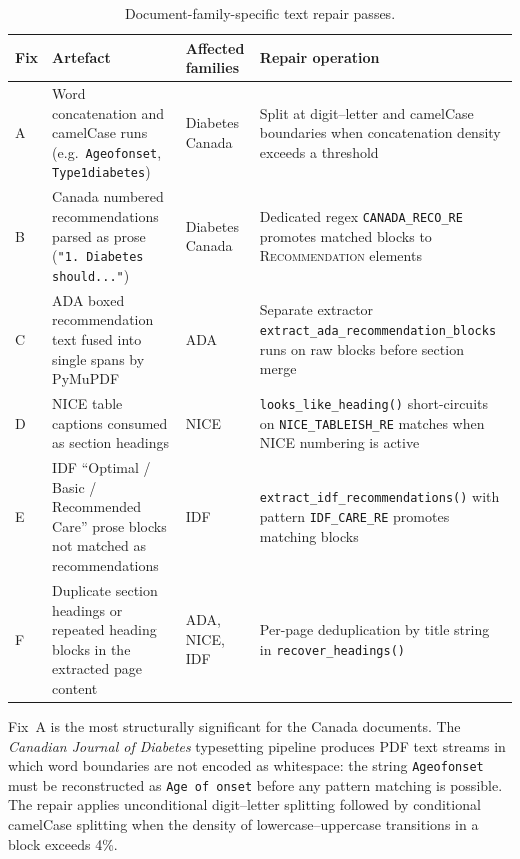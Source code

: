 \begin{table}[!ht]
\centering
\small\setlength{\tabcolsep}{5pt}
\begin{tabular}{p{0.7cm} p{3.2cm} p{2.5cm} p{4.8cm}}
\hline
\textbf{Fix} & \textbf{Artefact} & \textbf{Affected families}
              & \textbf{Repair operation} \\
\hline
A & Word concatenation and camelCase runs
    (e.g.\ \texttt{Ageofonset}, \texttt{Type1diabetes})
  & Diabetes Canada
  & Split at digit--letter and camelCase boundaries when
    concatenation density exceeds a threshold \\[4pt]
B & Canada numbered recommendations parsed as prose
    (\texttt{"1. Diabetes should..."})
  & Diabetes Canada
  & Dedicated regex \texttt{CANADA\_RECO\_RE} promotes
    matched blocks to \textsc{Recommendation} elements \\[4pt]
C & ADA boxed recommendation text fused into single spans by PyMuPDF
  & ADA
  & Separate extractor \texttt{extract\_ada\_recommendation\_blocks}
    runs on raw blocks before section merge \\[4pt]
D & NICE table captions consumed as section headings
  & NICE
  & \texttt{looks\_like\_heading()} short-circuits on
    \texttt{NICE\_TABLEISH\_RE} matches when NICE numbering
    is active \\[4pt]
E & IDF ``Optimal / Basic / Recommended Care'' prose blocks
    not matched as recommendations
  & IDF
  & \texttt{extract\_idf\_recommendations()} with pattern
    \texttt{IDF\_CARE\_RE} promotes matching blocks \\[4pt]
F & Duplicate section headings or repeated heading blocks in the extracted page content
  & ADA, NICE, IDF
  & Per-page deduplication by title string in
    \texttt{recover\_headings()} \\[4pt]
\hline
\end{tabular}
\caption{Document-family-specific text repair passes.}
\label{tab:repair}
\end{table}

Fix~A is the most structurally significant for the Canada documents. The
\textit{Canadian Journal of Diabetes} typesetting pipeline produces PDF text
streams in which word boundaries are not encoded as whitespace: the string
\texttt{Ageofonset} must be reconstructed as \texttt{Age of onset} before
any pattern matching is possible. The repair applies unconditional digit--letter
splitting followed by conditional camelCase splitting when the density of
lowercase--uppercase transitions in a block exceeds 4\%.

